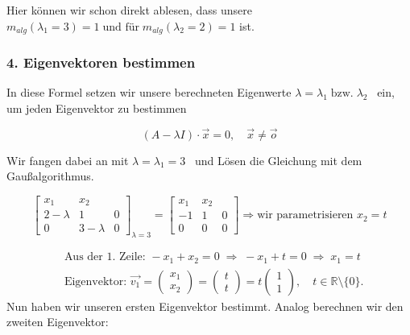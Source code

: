 \documentclass[a4paper,11pt,oneside,open=any,parskip=half, DIV=15]{scrreprt}
\begin{document}
      Hier können wir schon direkt ablesen, dass unsere \( m_{alg}({\lambda_1 = 3}) = 1 \; \text{und für} \; m_{alg}({\lambda_2 = 2}) = 1 \) ist. 

   \subsubsection*{4. Eigenvektoren bestimmen}

      In diese Formel setzen wir unsere berechneten Eigenwerte \( \lambda = \lambda_1 \; \text{bzw.} \; \lambda_2 \) \, ein, um jeden Eigenvektor zu bestimmen
      \begin{importantbox}
         \[
            ( A - \lambda I) \cdot \vec{x} = 0, \quad \vec{x} \neq \vec{o}
         \]
      \end{importantbox}

      Wir fangen dabei an mit \( \lambda = \lambda_1 = 3 \) \, und Lösen die Gleichung mit dem Gaußalgorithmus.

      \[
         \left[
            \begin{array}{cc|c} %
               x_1 & x_2 &\\ 
               \hline  %
               2-\lambda & 1 & 0\\
               0         & 3-\lambda & 0
            \end{array}
         \right]_{\lambda=3}
            =
         \left[
            \begin{array}{cc|c}  %
            x_1 & x_2 &\\ 
            \hline    %
            -1 & 1 & 0\\
            0  & 0 & 0
            \end{array}
         \right] \Rightarrow \text{wir parametrisieren } x_2 = t
      \]

      \[
         \begin{aligned}
            & \text{Aus der 1. Zeile: } -x_1 + x_2 = 0
            \; \Rightarrow \; -x_1 + t = 0
            \; \Rightarrow \; x_1 = t\\
            & \text{Eigenvektor: } \vec{v_1}
            = \begin{pmatrix}x_1\\ x_2\end{pmatrix}
            = \begin{pmatrix}t\\ t \end{pmatrix}
            = t \begin{pmatrix}1\\ 1 \end{pmatrix},
            \quad t\in\mathbb{R}\setminus\{0\}.
         \end{aligned}
      \] 
      Nun haben wir unseren ersten Eigenvektor bestimmt. Analog berechnen wir den zweiten Eigenvektor:
\end{document}
